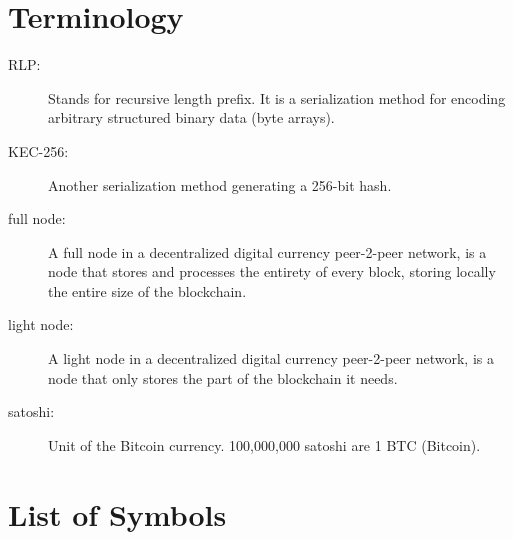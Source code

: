 \documentclass[USenglish]{uit-thesis}
\begin{document}
\begin{appendices}
	\chapter{Terminology}
	\label{app:terminology}
	\begin{description}
		\item[RLP:] Stands for recursive length prefix. It is a serialization method
		for encoding arbitrary structured binary data (byte arrays).
		\label{item:rlp}
		\item[KEC-256:] Another serialization method generating a 256-bit hash.
		\item[full node:] A full node in a decentralized digital currency peer-2-peer network, is a node that stores
		and processes the entirety of every block, storing locally the entire size of the blockchain.
		\item[light node:] A light node in a decentralized digital currency peer-2-peer network, is a node that only
		stores the part of the blockchain it needs.
		\item[satoshi:] Unit of the Bitcoin currency. 100,000,000 satoshi are 1 BTC (Bitcoin).
	\end{description}

\chapter{List of Symbols}


\end{appendices}
\end{document}
